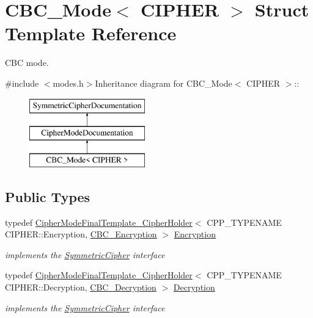 \hypertarget{struct_c_b_c___mode}{
\section{CBC\_\-Mode$<$ CIPHER $>$ Struct Template Reference}
\label{struct_c_b_c___mode}
}


CBC mode.  


{\ttfamily \#include $<$modes.h$>$}Inheritance diagram for CBC\_\-Mode$<$ CIPHER $>$::\begin{figure}[H]
\begin{center}
\leavevmode
\includegraphics[height=3cm]{struct_c_b_c___mode}
\end{center}
\end{figure}
\subsection*{Public Types}
\begin{DoxyCompactItemize}
\item 
\hypertarget{struct_c_b_c___mode_aca3f154b2e59961d8d7bf8cc4bd66a12}{
typedef \hyperlink{class_cipher_mode_final_template___cipher_holder}{CipherModeFinalTemplate\_\-CipherHolder}$<$ CPP\_\-TYPENAME CIPHER::Encryption, \hyperlink{class_c_b_c___encryption}{CBC\_\-Encryption} $>$ \hyperlink{struct_c_b_c___mode_aca3f154b2e59961d8d7bf8cc4bd66a12}{Encryption}}
\label{struct_c_b_c___mode_aca3f154b2e59961d8d7bf8cc4bd66a12}

\begin{DoxyCompactList}\small\item\em implements the \hyperlink{class_symmetric_cipher}{SymmetricCipher} interface \item\end{DoxyCompactList}\item 
\hypertarget{struct_c_b_c___mode_a0d901254786255c1ac2c617c6ae9be22}{
typedef \hyperlink{class_cipher_mode_final_template___cipher_holder}{CipherModeFinalTemplate\_\-CipherHolder}$<$ CPP\_\-TYPENAME CIPHER::Decryption, \hyperlink{class_c_b_c___decryption}{CBC\_\-Decryption} $>$ \hyperlink{struct_c_b_c___mode_a0d901254786255c1ac2c617c6ae9be22}{Decryption}}
\label{struct_c_b_c___mode_a0d901254786255c1ac2c617c6ae9be22}

\begin{DoxyCompactList}\small\item\em implements the \hyperlink{class_symmetric_cipher}{SymmetricCipher} interface \item\end{DoxyCompactList}\end{DoxyCompactItemize}


